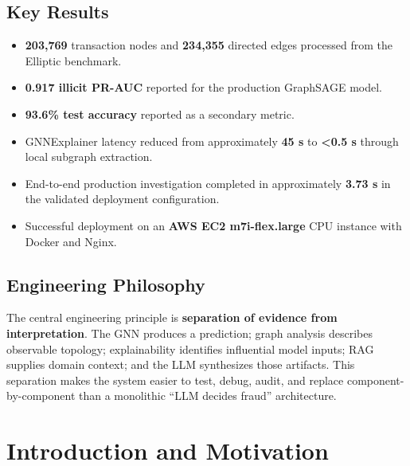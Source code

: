 \documentclass[11pt,a4paper]{report}
\begin{document}
\section*{Key Results}
\begin{itemize}[leftmargin=1.5em]
  \item \textbf{203,769} transaction nodes and \textbf{234,355} directed edges processed from the Elliptic benchmark.
  \item \textbf{0.917 illicit PR-AUC} reported for the production GraphSAGE model.
  \item \textbf{93.6\% test accuracy} reported as a secondary metric.
  \item GNNExplainer latency reduced from approximately \textbf{45 s} to \textbf{<0.5 s} through local subgraph extraction.
  \item End-to-end production investigation completed in approximately \textbf{3.73 s} in the validated deployment configuration.
  \item Successful deployment on an \textbf{AWS EC2 m7i-flex.large} CPU instance with Docker and Nginx.
\end{itemize}

\section*{Engineering Philosophy}
The central engineering principle is \textbf{separation of evidence from interpretation}. The GNN produces a prediction; graph analysis describes observable topology; explainability identifies influential model inputs; RAG supplies domain context; and the LLM synthesizes those artifacts. This separation makes the system easier to test, debug, audit, and replace component-by-component than a monolithic ``LLM decides fraud'' architecture.

\tableofcontents
\newpage

\chapter{Introduction and Motivation}
\end{document}
